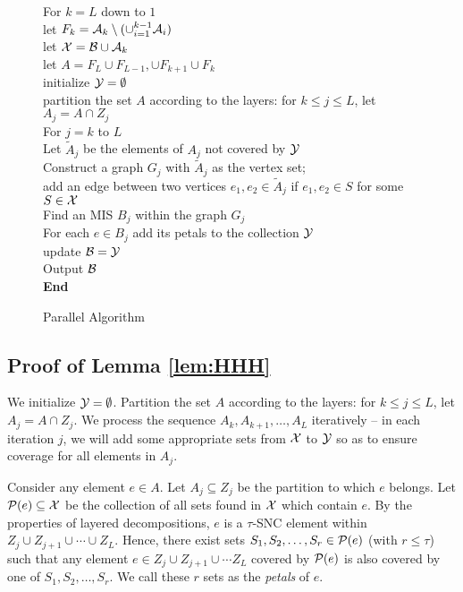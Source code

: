 \documentclass[11pt]{article}
\newcommand{\calA} {{\cal A}}
\newcommand{\calB} {{\cal B}}
\newcommand{\calP} {{\cal P}}
\newcommand{\calY} {{\cal Y}}
\newcommand{\calX} {{\cal X}}
\newcommand{\wt}[1] {\widetilde{#1}}
\begin{document}
\begin{figure}[htbp]
\begin{center}
{\begin{minipage}  {\textwidth}
\begin{tabbing}
\> For $k=L$ down to $1$ \\
\> \> let $F_k = \calA_k \setminus ( \cup_{i=1}^{k-1} \calA_i )$ \\
\> \> let $\calX = \calB \cup \calA_k$ \\
\> \> let $A=F_L\cup F_{L-1}, \cup F_{k+1}\cup F_k$ \\
\> \> initialize $\calY=\emptyset$ \\
\> \> partition the set $A$ according to the layers: for $k\leq j\leq L$, let $A_j=A\cap Z_j$ \\
\> \> For $j=k$ to $L$ \\
\> \> \> Let $\wt{A}_j$ be the elements of $A_j$ not covered by $\calY$ \\
\> \> \> Construct a graph $G_j$ with $\wt{A}_j$ as the vertex set; \\
\> \> \> \> add an edge between two vertices $e_1,e_2\in \wt{A}_j$ if $e_1,e_2 \in S$ for some $S\in \calX$ \\
\> \> \> Find an MIS $B_j$ within the graph $G_j$ \\
\> \> \> For each $e\in B_j$ add its petals to the collection $\calY$ \\
\> \> update $\calB = \calY$ \\
\> Output $\calB$ \\
\textbf{End}
\end{tabbing}
\end{minipage}
} \end{center}
\caption{Parallel Algorithm}
\label{fig:par}
\end{figure}

\subsection{Proof of Lemma \ref{lem:HHH}}
\label{sec:XY-lemma}
We initialize $\calY=\emptyset$. Partition the set $A$ according to the layers: for $k\leq j\leq L$, let $A_j=A\cap Z_j$. 
We process the sequence $A_k, A_{k+1}, \ldots, A_L$ iteratively -- in each iteration $j$,
we will add some appropriate sets from $\calX$ to $\calY$ so as to ensure coverage for all elements in $A_j$.

Consider any element $e\in A$. Let $A_j\subseteq Z_j$ be the partition to which $e$ belongs.
Let $\calP(e)\subseteq \calX$ be the collection of all sets found in $\calX$ which contain $e$.
By the properties of layered decompositions, $e$ is a $\tau$-SNC element within $Z_j\cup Z_{j+1}\cup \cdots \cup Z_L$.
Hence, there exist sets 
$S_1, S_2, \ldots, S_r\in \calP(e)$ (with $r\leq \tau$) such that
any element $e\in Z_j\cup Z_{j+1}\cup \cdots Z_L$ covered by $\calP(e)$
is also covered by one of $S_1, S_2, \ldots, S_r$.
We call these $r$ sets as the {\em petals} of $e$.
\end{document}
